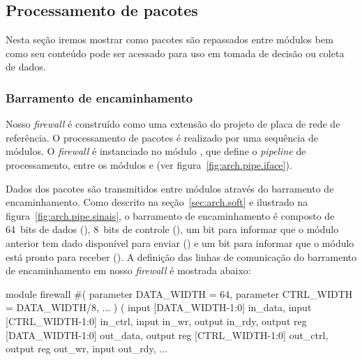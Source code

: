 \subsection{Processamento de pacotes}
\label{sec:impl.pkt}

Nesta seção iremos mostrar como pacotes são repassados entre módulos bem
como seu conteúdo pode ser acessado para uso em tomada de decisão ou
coleta de dados.

\subsubsection{Barramento de encaminhamento}

Nosso \emph{firewall} é construído como uma extensão do projeto de placa
de rede de referência. O processamento de pacotes é realizado por uma
sequência de módulos. O \emph{firewall} é instanciado no módulo
, que define o \emph{pipeline} de processamento,
entre os módulos  e  (ver
figura~\ref{fig:arch.pipe.iface}).

Dados dos pacotes são transmitidos entre módulos através do barramento
de encaminhamento.  Como descrito na seção~\ref{sec:arch.soft} e
ilustrado na figura~\ref{fig:arch.pipe.sinais}, o barramento de
encaminhamento é composto de 64~bits de dados (), 8~bits de
controle (), um bit para informar que o módulo anterior tem
dado disponível para enviar () e um bit para informar que o
módulo está pronto para receber ().  A definição das linhas de
comunicação do barramento de encaminhamento em nosso \emph{firewall} é
mostrada abaixo:

\begin{verilogcode}
module firewall
   #(
      parameter DATA_WIDTH = 64,
      parameter CTRL_WIDTH = DATA_WIDTH/8,
      ...
   )
   (
      input [DATA_WIDTH-1:0]              in_data,
      input [CTRL_WIDTH-1:0]              in_ctrl,
      input                               in_wr,
      output                              in_rdy,
      output reg [DATA_WIDTH-1:0]         out_data,
      output reg [CTRL_WIDTH-1:0]         out_ctrl,
      output reg                          out_wr,
      input                               out_rdy,
      ...
\end{verilogcode}

